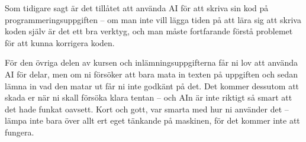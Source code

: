\documentclass[nobib]{tufte-handout}
\begin{document}
Som tidigare sagt är det tillåtet att använda AI för att skriva sin kod på programmeringsuppgiften -- om man inte vill lägga tiden på att lära sig att skriva koden själv är det ett bra verktyg, och man måste fortfarande förstå problemet för att kunna korrigera koden.

För den övriga delen av kursen och inlämningsuppgifterna får ni lov att använda AI för delar, men om ni försöker att bara mata in texten på uppgiften och sedan lämna in vad den matar ut får ni inte godkänt på det. Det kommer dessutom att skada er när ni skall försöka klara tentan -- och AIn är inte riktigt så smart att det hade funkat oavsett. Kort och gott, var smarta med hur ni använder det -- lämpa inte bara över allt ert eget tänkande på maskinen, för det kommer inte att fungera.

%
%
\end{document}

